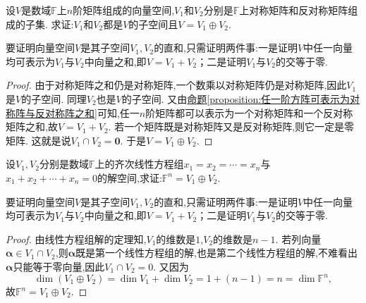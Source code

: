 \documentclass[lang=cn,newtx,10pt,scheme=chinese]{elegantbook}
\begin{document}
\begin{proposition}\label{proposition:矩阵空间可以分解为对称和反称矩阵空间的直和}
设\(V\)是数域\(\mathbb{F}\)上\(n\)阶矩阵组成的向量空间,\(V_1\)和\(V_2\)分别是\(\mathbb{F}\)上对称矩阵和反对称矩阵组成的子集. 求证:\(V_1\)和\(V_2\)都是\(V\)的子空间且\(V = V_1\oplus V_2\).
\end{proposition}
\begin{note}
    要证明向量空间\(V\)是其子空间\(V_1,V_2\)的直和,只需证明两件事:一是证明\(V\)中任一向量均可表示为\(V_1\)与\(V_2\)中向量之和,即\(V = V_1 + V_2\)；二是证明\(V_1\)与\(V_2\)的交等于零.
\end{note}
\begin{proof}
    由于对称矩阵之和仍是对称矩阵,一个数乘以对称矩阵仍是对称矩阵,因此\(V_1\)是\(V\)的子空间. 同理\(V_2\)也是\(V\)的子空间. 又由\hyperref[proposition:任一阶方阵可表示为对称阵与反对称阵之和]{命题\ref{proposition:任一阶方阵可表示为对称阵与反对称阵之和}}可知,任一\(n\)阶矩阵都可以表示为一个对称矩阵和一个反对称矩阵之和,故\(V = V_1 + V_2\). 若一个矩阵既是对称矩阵又是反对称矩阵,则它一定是零矩阵. 这就是说\(V_1\cap V_2 =\mathbf{0}\). 于是\(V = V_1\oplus V_2\). 
\end{proof}

\begin{example}
设\(V_1,V_2\)分别是数域\(\mathbb{F}\)上的齐次线性方程组\(x_1 = x_2=\cdots = x_n\)与\(x_1 + x_2+\cdots + x_n = 0\)的解空间,求证:\(\mathbb{F}^n = V_1\oplus V_2\).
\end{example}
\begin{note}
    要证明向量空间\(V\)是其子空间\(V_1,V_2\)的直和,只需证明两件事:一是证明\(V\)中任一向量均可表示为\(V_1\)与\(V_2\)中向量之和,即\(V = V_1 + V_2\)；二是证明\(V_1\)与\(V_2\)的交等于零.
\end{note}
\begin{proof}
    由线性方程组解的定理知,\(V_1\)的维数是\(1\),\(V_2\)的维数是\(n - 1\). 若列向量\(\boldsymbol{\alpha}\in V_1\cap V_2\),则\(\boldsymbol{\alpha}\)既是第一个线性方程组的解,也是第二个线性方程组的解,不难看出\(\boldsymbol{\alpha}\)只能等于零向量,因此\(V_1\cap V_2 = 0\). 又因为
\[
\dim(V_1\oplus V_2)=\dim V_1+\dim V_2=1+(n - 1)=n=\dim\mathbb{F}^n,
\]
故\(\mathbb{F}^n = V_1\oplus V_2\).
\end{proof}
\end{document}
